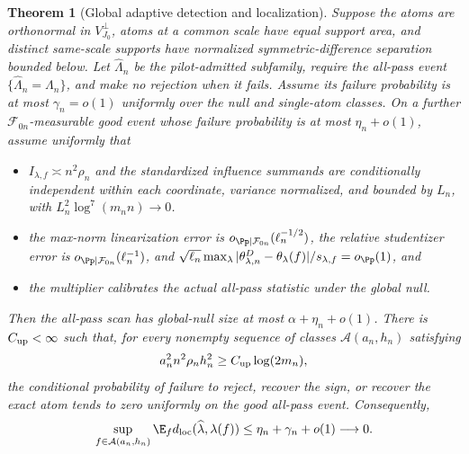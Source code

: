 \documentclass[11pt]{article}
\newtheorem{theorem}{Theorem}[section]
\theoremstyle{definition}
\newcommand{\1}{\mathbf 1}\newcommand{\op}{\operatorname}
\newcommand{\cA}{\mathcal A}\newcommand{\cG}{\mathcal G}\newcommand{\suppsec}[2]{Appendix~\ref{#2}}
\begin{document}
\begin{theorem}[Global adaptive detection and localization]\label{thm:minimax}
Suppose the atoms are orthonormal in $V_{J_0}^{\perp}$, atoms at a common scale
have equal support area, and distinct same-scale supports have normalized
symmetric-difference separation bounded below.  Let $\widehat\Lambda_n$ be the
pilot-admitted subfamily, require the all-pass event
$\{\widehat\Lambda_n=\Lambda_n\}$, and make no rejection when it fails.  Assume its
failure probability is at most $\gamma_n=o(1)$ uniformly over the null and
single-atom classes.  On a further $\mathcal F_{0n}$-measurable good event whose
failure probability is at most $\eta_n+o(1)$, assume uniformly that
\begin{itemize}[leftmargin=1.6em,itemsep=2pt,topsep=2pt]
\item $I_{\lambda,f}\asymp n^2\rho_n$ and the standardized influence summands are
conditionally independent within each coordinate, variance normalized, and bounded
by $L_n$, with $L_n^2\log^7(m_nn)\to0$.
\item the max-norm linearization error is $o_{\Pp\mid\mathcal F_{0n}}(\ell_n^{-1/2})$,
the relative studentizer error is $o_{\Pp\mid\mathcal F_{0n}}(\ell_n^{-1})$, and
$\sqrt{\ell_n}\max_\lambda
|\theta_{\lambda,n}^{D}-\theta_\lambda(f)|/s_{\lambda,f}=o_\Pp(1)$, and
\item the multiplier calibrates the actual all-pass statistic under the global null.
\end{itemize}
Then the all-pass scan has global-null size at most $\alpha+\eta_n+o(1)$.
There is $C_{\rm up}<\infty$ such that, for every nonempty sequence of classes
$\cA(a_n,h_n)$ satisfying
\begin{equation}
 a_n^2n^2\rho_n h_n^2
 \ge C_{\rm up}\log(2m_n),                                     \label{eq:upperboundary}
\end{equation}
the conditional probability of failure to reject, recover the sign, or recover the
exact atom tends to zero uniformly on the good all-pass event.  Consequently,
\begin{equation}
 \sup_{f\in\cA(a_n,h_n)}\E_f d_{\rm loc}(\widehat\lambda,\lambda(f))
 \le\eta_n+\gamma_n+o(1)\longrightarrow0.                        \label{eq:localup}
\end{equation}


\end{theorem}
\end{document}
